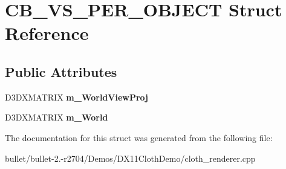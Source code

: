 \hypertarget{struct_c_b___v_s___p_e_r___o_b_j_e_c_t}{\section{C\+B\+\_\+\+V\+S\+\_\+\+P\+E\+R\+\_\+\+O\+B\+J\+E\+C\+T Struct Reference}
\label{struct_c_b___v_s___p_e_r___o_b_j_e_c_t}
}
\subsection*{Public Attributes}
\begin{DoxyCompactItemize}
\item 
\hypertarget{struct_c_b___v_s___p_e_r___o_b_j_e_c_t_a950b9fee92090c44cb78d59d64c933c7}{D3\+D\+X\+M\+A\+T\+R\+I\+X {\bfseries m\+\_\+\+World\+View\+Proj}}\label{struct_c_b___v_s___p_e_r___o_b_j_e_c_t_a950b9fee92090c44cb78d59d64c933c7}

\item 
\hypertarget{struct_c_b___v_s___p_e_r___o_b_j_e_c_t_afea12fe3ad345ba85d0918833518dacb}{D3\+D\+X\+M\+A\+T\+R\+I\+X {\bfseries m\+\_\+\+World}}\label{struct_c_b___v_s___p_e_r___o_b_j_e_c_t_afea12fe3ad345ba85d0918833518dacb}

\end{DoxyCompactItemize}


The documentation for this struct was generated from the following file\+:\begin{DoxyCompactItemize}
\item 
bullet/bullet-\/2.-\/r2704/\+Demos/\+D\+X11\+Cloth\+Demo/cloth\+\_\+renderer.\+cpp\end{DoxyCompactItemize}
